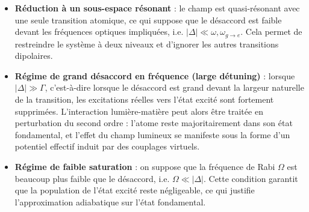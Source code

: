 \begin{itemize}[label = $\bullet$]
  \item \textbf{Réduction à un sous-espace résonant} : le champ est quasi-résonant avec une seule transition atomique, ce qui suppose que le désaccord est faible devant les fréquences optiques impliquées, i.e. $|\Delta| \ll \omega, \omega_{\scriptstyle g \rightarrow e}$. Cela permet de restreindre le système à deux niveaux et d’ignorer les autres transitions dipolaires.
  
  \item \textbf{Régime de grand désaccord en fréquence (large détuning)} : lorsque $|\Delta| \gg \Gamma$, c’est-à-dire lorsque le désaccord est grand devant la largeur naturelle de la transition, les excitations réelles vers l’état excité sont fortement supprimées. L’interaction lumière-matière peut alors être traitée en perturbation du second ordre : l’atome reste majoritairement dans son état fondamental, et l’effet du champ lumineux se manifeste sous la forme d’un potentiel effectif induit par des couplages virtuels.
  
  \item \textbf{Régime de faible saturation} : on suppose que la fréquence de Rabi $\Omega$ est beaucoup plus faible que le désaccord, i.e. $\Omega \ll |\Delta|$. Cette condition garantit que la population de l’état excité reste négligeable, ce qui justifie l’approximation adiabatique sur l’état fondamental.
\end{itemize}







